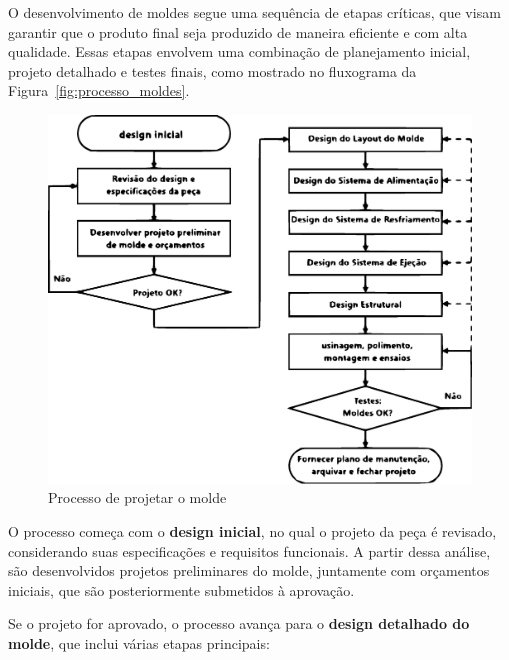 O desenvolvimento de moldes segue uma sequência de etapas críticas, que visam garantir que o produto final seja produzido de maneira eficiente e com alta qualidade. Essas etapas envolvem uma combinação de planejamento inicial, projeto detalhado e testes finais, como mostrado no fluxograma da Figura~\ref{fig:processo_moldes}.

\begin{figure}[h]
    \centering
    \includegraphics[keepaspectratio=true,scale=0.3]{figuras/aspectosgerais/Processo_de_criacao_de_molde.eps}
    \caption{Processo de projetar o molde}
    \label{processo_molde}
\end{figure}

O processo começa com o \textbf{design inicial}, no qual o projeto da peça é revisado, considerando suas especificações e requisitos funcionais. A partir dessa análise, são desenvolvidos projetos preliminares do molde, juntamente com orçamentos iniciais, que são posteriormente submetidos à aprovação.

Se o projeto for aprovado, o processo avança para o \textbf{design detalhado do molde}, que inclui várias etapas principais:

